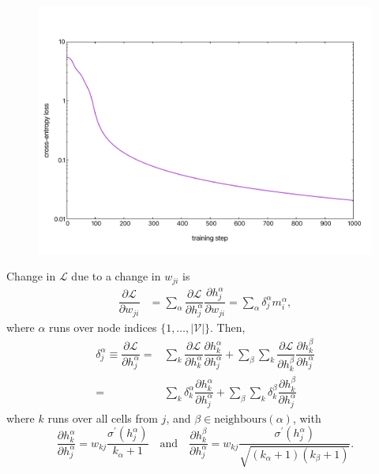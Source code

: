 \documentclass[mathserif,10pt]{beamer}
\begin{document}
\begin{frame}
  \begin{figure}
    \includegraphics[scale=0.30]{figs/fig02b.pdf}
  \end{figure}
\end{frame}

\begin{frame}
  Change in $\mathcal{L}$ due to a change in $w_{ji}$ is
  \begin{equation}
    \begin{split}
      \dfrac{\partial \mathcal{L}}{\partial w_{ji}} &= \sum_\alpha \dfrac{\partial \mathcal{L}}{\partial h^\alpha_j}\dfrac{\partial h^\alpha_j}{\partial w_{ji}} = \sum_\alpha \delta^\alpha_j m^\alpha_i,
    \end{split}
  \end{equation}
  where $\alpha$ runs over node indices $\lbrace 1, \hdots, |\mathcal{V}|\rbrace$. Then,
  \begin{equation}
    \begin{split}
      \delta^\alpha_j \equiv \dfrac{\partial \mathcal{L}}{\partial h^\alpha_j} =& \sum_k \dfrac{\partial \mathcal{L}}{\partial h^\alpha_k} \dfrac{\partial h^\alpha_k}{\partial h^\alpha_j} + \sum_{\beta} \sum_k \dfrac{\partial \mathcal{L}}{\partial h^\beta_k} \dfrac{\partial h^\beta_k}{\partial h^\alpha_j}\\
      =& \sum_k \delta^\alpha_k \dfrac{\partial h^\alpha_k}{\partial h^\alpha_j} + \sum_{\beta} \sum_k \delta^\beta_k \dfrac{\partial h^\beta_k}{\partial h^\alpha_j}
    \end{split}
  \end{equation}
  where $k$ runs over all cells from $j$, and $\beta \in \text{neighbours}(\alpha)$, with
  \begin{equation}
    \dfrac{\partial h^\alpha_k}{\partial h^\alpha_j} = w_{kj}\dfrac{\sigma^\prime(h_j^\alpha)}{k_\alpha + 1} \quad \text{and} \quad \dfrac{\partial h^\beta_k}{\partial h^\alpha_j} = w_{kj}\dfrac{\sigma^\prime(h_j^\alpha)}{\sqrt{(k_\alpha + 1)(k_\beta + 1)}}.
  \end{equation}
\end{frame}
\end{document}
